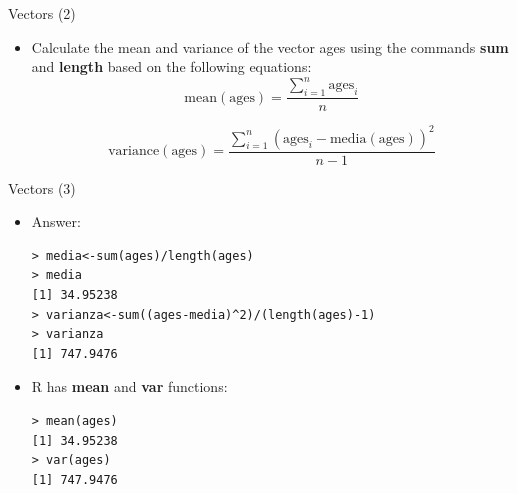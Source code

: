 \documentclass[handout]{beamer}
\begin{document}
\begin{frame}[fragile]{Vectors (2)}
\scriptsize{
\begin{itemize}
 \item Calculate the mean and variance of the vector ages using the commands \textbf{sum} and \textbf{length} based on the following equations:
 \begin{equation}
  \text{mean}(\text{ages})=\frac{\sum_{i=1}^n\text{ages}_{i}}{n}
 \end{equation}
 
 \begin{equation}
 \text{variance}(\text{ages})=\frac{\sum_{i=1}^n(\text{ages}_{i}-\text{media}(\text{ages}))^2 }{n-1} 
 \end{equation}

 
\end{itemize}



}

 
\end{frame}



\begin{frame}[fragile]{Vectors (3)}
\scriptsize{
\begin{itemize}
 \item Answer:
 \begin{verbatim}
> media<-sum(ages)/length(ages)
> media
[1] 34.95238
> varianza<-sum((ages-media)^2)/(length(ages)-1)
> varianza
[1] 747.9476
 \end{verbatim}
 
 \item R has \textbf{mean} and \textbf{var} functions:
 \begin{verbatim}
> mean(ages)
[1] 34.95238
> var(ages)
[1] 747.9476

 \end{verbatim}
 
\end{itemize}



}

 
\end{frame}
 
\end{document}
